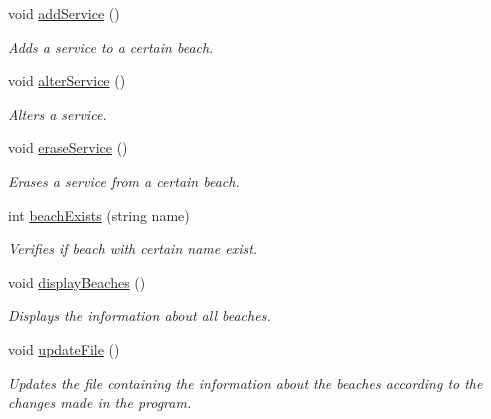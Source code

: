 \begin{DoxyCompactItemize}
\mbox{\label{class_company_ade7da5185959ac2ec280f94381a4c531}} 
void \hyperlink{class_company_ade7da5185959ac2ec280f94381a4c531}{add\+Service} ()
\begin{DoxyCompactList}\small\item\em Adds a service to a certain beach. \end{DoxyCompactList}\item 
\mbox{\label{class_company_a0ec21ed7be545ec7154e0c2295ce804c}} 
void \hyperlink{class_company_a0ec21ed7be545ec7154e0c2295ce804c}{alter\+Service} ()
\begin{DoxyCompactList}\small\item\em Alters a service. \end{DoxyCompactList}\item 
\mbox{\label{class_company_a1c64f4273adb50b24e1cb2bf2c05ac08}} 
void \hyperlink{class_company_a1c64f4273adb50b24e1cb2bf2c05ac08}{erase\+Service} ()
\begin{DoxyCompactList}\small\item\em Erases a service from a certain beach. \end{DoxyCompactList}\item 
int \hyperlink{class_company_afabcb7d6b8e6fdb49ce4c9352ac88287}{beach\+Exists} (string name)
\begin{DoxyCompactList}\small\item\em Verifies if beach with certain name exist. \end{DoxyCompactList}\item 
\mbox{\label{class_company_ad740b440f2fa9948324c0aa0fa6d026e}} 
void \hyperlink{class_company_ad740b440f2fa9948324c0aa0fa6d026e}{display\+Beaches} ()
\begin{DoxyCompactList}\small\item\em Displays the information about all beaches. \end{DoxyCompactList}\item 
\mbox{\label{class_company_ad8d5d9aba5b078ca69fbc3f40b2bd282}} 
void \hyperlink{class_company_ad8d5d9aba5b078ca69fbc3f40b2bd282}{update\+File} ()
\begin{DoxyCompactList}\small\item\em Updates the file containing the information about the beaches according to the changes made in the program. \end{DoxyCompactList}\item 

\end{DoxyCompactItemize}
